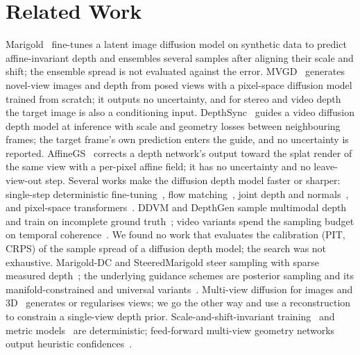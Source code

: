\section{Related Work}
\label{sec:related}
Marigold~\cite{ke2024marigold} fine-tunes a latent image diffusion model on synthetic data to predict affine-invariant depth and
ensembles several samples after aligning their scale and shift; the ensemble spread is not evaluated against the error.
MVGD~\cite{guizilini2025mvgd} generates novel-view images and depth from posed views with a pixel-space diffusion model trained
from scratch; it outputs no uncertainty, and for stereo and video depth the target image is also a conditioning input.
DepthSync~\cite{depthsync2025} guides a video diffusion depth model at inference with scale and geometry losses between neighbouring frames;
the target frame's own prediction enters the guide, and no uncertainty is reported.
AffineGS~\cite{tse2026affinegs} corrects a depth network's output toward the splat render of the same view with a per-pixel affine field;
it has no uncertainty and no leave-view-out step.
Several works make the diffusion depth model faster or sharper: single-step deterministic fine-tuning~\cite{garciamartin2025e2edepth,he2024lotus}, flow matching~\cite{gui2025depthfm}, joint depth and normals~\cite{fu2024geowizard}, and pixel-space transformers~\cite{xu2025pixelperfect}.
DDVM and DepthGen sample multimodal depth and train on incomplete ground truth~\cite{saxena2023ddvm,saxena2023depthgen}; video variants spend the sampling budget on temporal coherence~\cite{hu2024depthcrafter,ke2024rollingdepth,yang2024depthanyvideo}.
We found no work that evaluates the calibration (PIT, CRPS) of the sample spread of a diffusion depth model; the search was not exhaustive.
Marigold-DC and SteeredMarigold steer sampling with sparse measured depth~\cite{viola2025marigolddc,gregorek2024steeredmarigold}; the underlying guidance schemes are posterior sampling and its manifold-constrained and universal variants~\cite{chung2023dps,chung2022mcg,bansal2023universal,he2023mpgd}.
Multi-view diffusion for images and 3D~\cite{gao2024cat3d,wu2023reconfusion,shi2023mvdream,tang2023mvdiffusion} generates or regularises views; we go the other way and use a reconstruction to constrain a single-view depth prior.
Scale-and-shift-invariant training~\cite{ranftl2022midas,ranftl2021dpt,yang2024depthanything,yang2024depthanythingv2} and metric models~\cite{yin2023metric3d,hu2024metric3dv2,piccinelli2024unidepth,bochkovskii2025depthpro,bhat2023zoedepth} are deterministic; feed-forward multi-view geometry networks output heuristic confidences~\cite{wang2023dust3r,leroy2024mast3r,wang2025vggt}.
